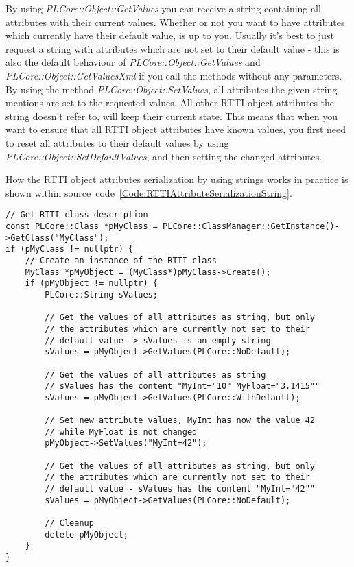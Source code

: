 By using \emph{PLCore::Object::GetValues} you can receive a string containing all attributes with their current values. Whether or not you want to have attributes which currently have their default value, is up to you. Usually it's best to just request a string with attributes which are not set to their default value - this is also the default behaviour of \emph{PLCore::Object::GetValues} and \emph{PLCore::Object::GetValuesXml} if you call the methods without any parameters. By using the method \emph{PLCore::Object::SetValues}, all attributes the given string mentions are set to the requested values. All other \ac{RTTI} object attributes the string doesn't refer to, will keep their current state. This means that when you want to ensure that all \ac{RTTI} object attributes have known values, you first need to reset all attributes to their default values by using \emph{PLCore::Object::SetDefaultValues}, and then setting the changed attributes.

How the \ac{RTTI} object attributes serialization by using strings works in practice is shown within source~code~\ref{Code:RTTIAttributeSerializationString}.
\begin{lstlisting}[label=Code:RTTIAttributeSerializationString,caption={\ac{RTTI} object attributes serialization by using strings}]
// Get RTTI class description
const PLCore::Class *pMyClass = PLCore::ClassManager::GetInstance()->GetClass("MyClass");
if (pMyClass != nullptr) {
	// Create an instance of the RTTI class
	MyClass *pMyObject = (MyClass*)pMyClass->Create();
	if (pMyObject != nullptr) {
		PLCore::String sValues;

		// Get the values of all attributes as string, but only
		// the attributes which are currently not set to their
		// default value -> sValues is an empty string
		sValues = pMyObject->GetValues(PLCore::NoDefault);

		// Get the values of all attributes as string
		// sValues has the content "MyInt="10" MyFloat="3.1415""
		sValues = pMyObject->GetValues(PLCore::WithDefault);

		// Set new attribute values, MyInt has now the value 42
		// while MyFloat is not changed
		pMyObject->SetValues("MyInt=42");

		// Get the values of all attributes as string, but only
		// the attributes which are currently not set to their
		// default value - sValues has the content "MyInt="42""
		sValues = pMyObject->GetValues(PLCore::NoDefault);

		// Cleanup
		delete pMyObject;
	}
}
\end{lstlisting}

